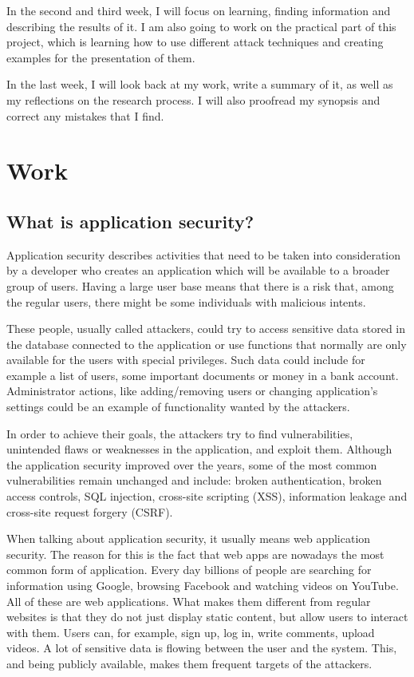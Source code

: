 \documentclass[a4paper]{article}
\begin{document}
In the second and third week, I will focus on learning, finding information and
describing the results of it. I am also going to work on the practical part of
this project, which is learning how to use different attack techniques and
creating examples for the presentation of them.

In the last week, I will look back at my work, write a summary of it, as well as
my reflections on the research process. I will also proofread my synopsis and
correct any mistakes that I find.

\newpage

\section{Work}

\subsection{What is application security?}

Application security describes activities that need to be taken into
consideration by a developer who creates an application which will be available
to a broader group of users. Having a large user base means that there is a risk
that, among the regular users, there might be some individuals with malicious
intents.

These people, usually called attackers, could try to access sensitive data
stored in the database connected to the application or use functions that
normally are only available for the users with special privileges. Such data
could include for example a list of users, some important documents or money in
a bank account. Administrator actions, like adding/removing users or changing
application's settings could be an example of functionality wanted by the
attackers.

In order to achieve their goals, the attackers try to find vulnerabilities,
unintended flaws or weaknesses in the application, and exploit them. Although
the application security improved over the years, some of the most common
vulnerabilities remain unchanged and include: broken authentication, broken
access controls, SQL injection, cross-site scripting (XSS), information leakage
and cross-site request forgery (CSRF).

When talking about application security, it usually means web application
security. The reason for this is the fact that web apps are nowadays the most
common form of application. Every day billions of people are searching for
information using Google, browsing Facebook and watching videos on YouTube. All
of these are web applications. What makes them different from regular websites
is that they do not just display static content, but allow users to interact
with them. Users can, for example, sign up, log in, write comments, upload
videos. A lot of sensitive data is flowing between the user and the system.
This, and being publicly available, makes them frequent targets of the
attackers.
\end{document}
